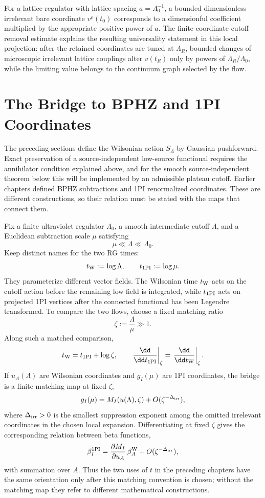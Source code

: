 For a lattice regulator with lattice spacing \(a=\Lambda_0^{-1}\), a bounded
dimensionless irrelevant bare coordinate \(v^\rho(t_0)\) corresponds to a
dimensionful coefficient multiplied by the appropriate positive power of
\(a\).  The finite-coordinate cutoff-removal estimate explains the resulting
universality statement in this local projection: after the retained
coordinates are tuned at
\(\Lambda_R\), bounded changes of microscopic irrelevant lattice couplings
alter \(v(t_R)\) only by powers of \(\Lambda_R/\Lambda_0\), while the limiting
value belongs to the continuum graph selected by the flow.

\section{The Bridge to BPHZ and 1PI Coordinates}

The preceding sections define the Wilsonian action \(S_\Lambda\) by Gaussian
pushforward.  Exact preservation of a source-independent low-source functional
requires the annihilator condition explained above, and for the smooth
source-independent theorem below this will be implemented by an admissible
plateau cutoff.  Earlier chapters defined BPHZ subtractions and 1PI
renormalized coordinates.  These are different constructions, so their
relation must be stated with the maps that connect them.

Fix a finite ultraviolet regulator \(\Lambda_0\), a smooth intermediate cutoff
\(\Lambda\), and a Euclidean subtraction scale \(\mu\) satisfying
\[
  \mu\ll\Lambda\ll\Lambda_0 .
\]
Keep distinct names for the two RG times:
\[
  t_{\rm W}:=\log\Lambda,
  \qquad
  t_{\rm 1PI}:=\log\mu .
\]
They parameterize different vector fields.  The Wilsonian time \(t_{\rm W}\)
acts on the cutoff action before the remaining low field is integrated, while
\(t_{\rm 1PI}\) acts on projected 1PI vertices after the connected functional
has been Legendre transformed.  To compare the two flows, choose a fixed
matching ratio
\[
  \zeta:=\frac{\Lambda}{\mu}\gg 1 .
\]
Along such a matched comparison,
\[
  t_{\rm W}=t_{\rm 1PI}+\log\zeta,
  \qquad
  \left.\frac{\dd}{\dd t_{\rm 1PI}}\right|_{\zeta}
  =
  \left.\frac{\dd}{\dd t_{\rm W}}\right|_{\zeta}.
\]
If \(u_A(\Lambda)\) are Wilsonian coordinates and \(g_I(\mu)\) are 1PI
coordinates, the bridge is a finite matching map at fixed \(\zeta\),
\[
  g_I(\mu)
  =
  M_I(u(\Lambda),\zeta)
  +
  O(\zeta^{-\Delta_{\rm irr}}),
\]
where \(\Delta_{\rm irr}>0\) is the smallest suppression exponent among the
omitted irrelevant coordinates in the chosen local expansion.  Differentiating
at fixed \(\zeta\) gives the corresponding relation between beta functions,
\[
  \beta_I^{\rm 1PI}
  =
  \frac{\partial M_I}{\partial u_A}\,
  \beta_A^{\rm W}
  +
  O(\zeta^{-\Delta_{\rm irr}}),
\]
with summation over \(A\).  Thus the two uses of \(t\) in the preceding
chapters have the same orientation only after this matching convention is
chosen; without the matching map they refer to different mathematical
constructions.

